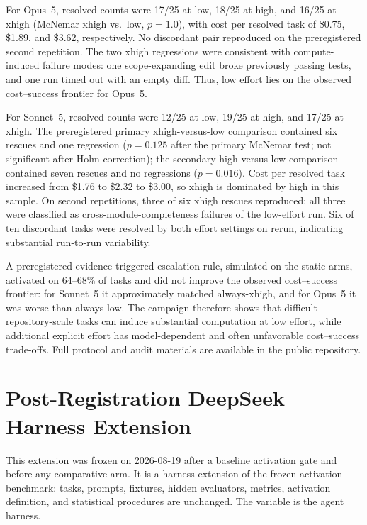 \documentclass[11pt]{article}
\begin{document}
For Opus~5, resolved counts were 17/25 at low, 18/25 at high, and 16/25 at
xhigh (McNemar xhigh vs.\ low, $p=1.0$), with cost per resolved task of
\$0.75, \$1.89, and \$3.62, respectively. No discordant pair reproduced on
the preregistered second repetition. The two xhigh regressions were
consistent with compute-induced failure modes: one scope-expanding edit
broke previously passing tests, and one run timed out with an empty diff.
Thus, low effort lies on the observed cost--success frontier for Opus~5.

For Sonnet~5, resolved counts were 12/25 at low, 19/25 at high, and 17/25 at
xhigh. The preregistered primary xhigh-versus-low comparison contained six
rescues and one regression ($p=0.125$ after the primary McNemar test; not
significant after Holm correction); the secondary high-versus-low comparison
contained seven rescues and no regressions ($p=0.016$). Cost per resolved
task increased from \$1.76 to \$2.32 to \$3.00, so xhigh is dominated by
high in this sample. On second repetitions, three of six xhigh rescues
reproduced; all three were classified as cross-module-completeness failures
of the low-effort run. Six of ten discordant tasks were resolved by both
effort settings on rerun, indicating substantial run-to-run variability.

A preregistered evidence-triggered escalation rule, simulated on the static
arms, activated on 64--68\% of tasks and did not improve the observed
cost--success frontier: for Sonnet~5 it approximately matched always-xhigh,
and for Opus~5 it was worse than always-low. The campaign therefore shows
that difficult repository-scale tasks can induce substantial computation at
low effort, while additional explicit effort has model-dependent and often
unfavorable cost--success trade-offs. Full protocol and audit materials are
available in the public repository.

\section{Post-Registration DeepSeek Harness Extension}
\label{app:dsh}
This extension was frozen on 2026-08-19 after a baseline activation gate and
before any comparative arm. It is a harness extension of the frozen activation
benchmark: tasks, prompts, fixtures, hidden evaluators, metrics, activation
definition, and statistical procedures are unchanged. The variable is the
agent harness.
\end{document}
